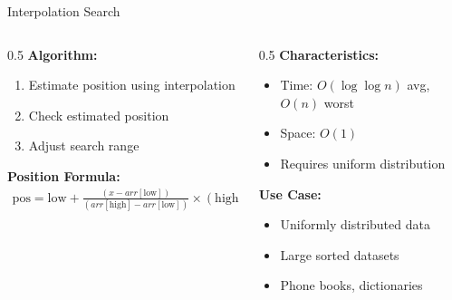 \documentclass[aspectratio=169,xcolor=dvipsnames]{beamer}
\begin{document}
\begin{frame}{Interpolation Search}
  \begin{columns}
    \begin{column}{0.5\textwidth}
      \textbf{Algorithm:}
      \begin{enumerate}
        \item Estimate position using interpolation
        \item Check estimated position
        \item Adjust search range
      \end{enumerate}

      \vspace{0.3cm}
      \textbf{Position Formula:}
      \begin{align*}
        \text{pos} = \text{low} + \frac{(x - arr[\text{low}])}{(arr[\text{high}] - arr[\text{low}])} \times (\text{high} - \text{low})
      \end{align*}
    \end{column}

    \begin{column}{0.5\textwidth}
      \textbf{Characteristics:}
      \begin{itemize}
        \item Time: $O(\log \log n)$ avg, $O(n)$ worst
        \item Space: $O(1)$
        \item Requires uniform distribution
      \end{itemize}

      \vspace{0.3cm}
      \textbf{Use Case:}
      \begin{itemize}
        \item Uniformly distributed data
        \item Large sorted datasets
        \item Phone books, dictionaries
      \end{itemize}
    \end{column}
  \end{columns}
\end{frame}
\end{document}
